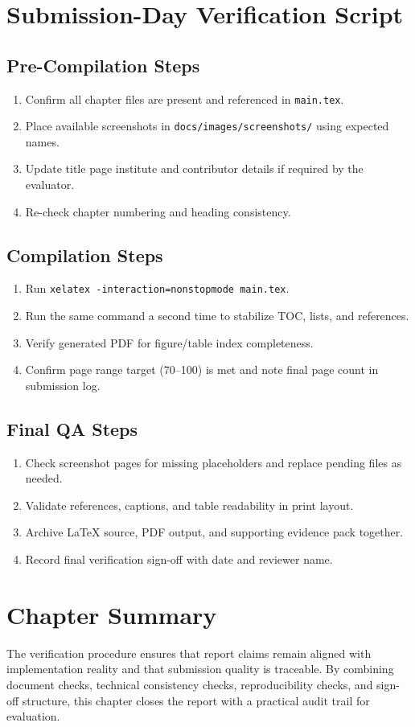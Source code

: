 \section{Submission-Day Verification Script}

\subsection{Pre-Compilation Steps}

\begin{enumerate}
\item Confirm all chapter files are present and referenced in \texttt{main.tex}.
\item Place available screenshots in \texttt{docs/images/screenshots/} using expected names.
\item Update title page institute and contributor details if required by the evaluator.
\item Re-check chapter numbering and heading consistency.
\end{enumerate}

\subsection{Compilation Steps}

\begin{enumerate}
\item Run \texttt{xelatex -interaction=nonstopmode main.tex}.
\item Run the same command a second time to stabilize TOC, lists, and references.
\item Verify generated PDF for figure/table index completeness.
\item Confirm page range target (70--100) is met and note final page count in submission log.
\end{enumerate}

\subsection{Final QA Steps}

\begin{enumerate}
\item Check screenshot pages for missing placeholders and replace pending files as needed.
\item Validate references, captions, and table readability in print layout.
\item Archive LaTeX source, PDF output, and supporting evidence pack together.
\item Record final verification sign-off with date and reviewer name.
\end{enumerate}

\section{Chapter Summary}

The verification procedure ensures that report claims remain aligned with implementation reality and that submission quality is traceable. By combining document checks, technical consistency checks, reproducibility checks, and sign-off structure, this chapter closes the report with a practical audit trail for evaluation.
